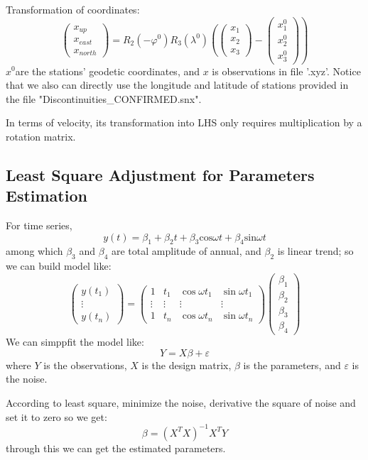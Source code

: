 \documentclass{article}
\begin{document}
Transformation of coordinates:
$$\left.\begin{pmatrix}x_{up}\\x_{east}\\x_{north}\end{pmatrix}=R_2(-\varphi^0)R_3(\lambda^0)\left(\begin{pmatrix}x_1\\x_2\\x_3\end{pmatrix}\right.-\begin{pmatrix}x_1^0\\x_2^0\\x_3^0\end{pmatrix}\right)$$
$x^0$are the stations' geodetic coordinates, and $x$ is observations in file '.xyz'.
Notice that we also can directly use the longitude and latitude of stations provided in the file "Discontinuities\_CONFIRMED.snx".

In terms of velocity, its transformation into LHS only requires multiplication by a rotation matrix.
\subsection{Least Square Adjustment for Parameters Estimation}
For time series, $$ y(t)=\beta_{1}+\beta_{2}t+\beta_{3}\mathrm{cos}\omega t+\beta_{4}\mathrm{sin}\omega t $$
among which $\beta_3$ and $\beta_4$ are total amplitude of annual, and $\beta_2$ is linear trend; so we can build model like:
$$\begin{pmatrix}y(t_1)\\\vdots\\y(t_n)\end{pmatrix}=\begin{pmatrix}1&t_1&\cos\omega t_1&\sin\omega t_1\\\vdots&\vdots&\vdots&\vdots\\1&t_n&\cos\omega t_n&\sin\omega t_n\end{pmatrix}\begin{pmatrix}\beta_1\\\beta_2\\\beta_3\\\beta_4\end{pmatrix}$$
We can simppfit the model like: $$Y=X\beta+\varepsilon$$
where $Y$ is the observations, $X$ is the design matrix, $\beta$ is the parameters, and $\varepsilon$ is the noise.

According to least square, minimize the noise, 
derivative the square of noise and set it to zero so we get:
$$\beta=(X^TX)^{-1}X^TY$$ through this we can get the estimated parameters.
\end{document}

